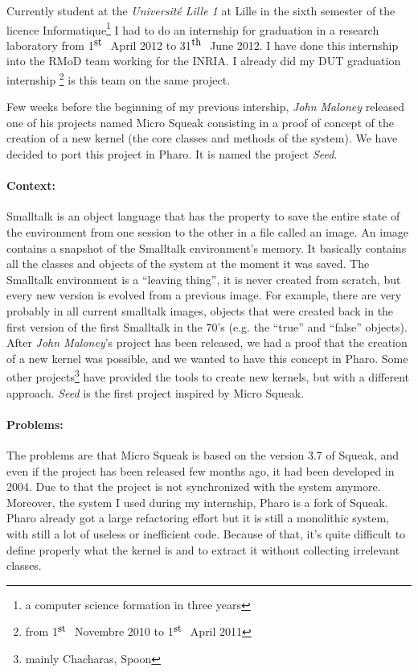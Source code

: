 Currently student at the \emph{Universit\'{e} Lille 1} at Lille in the sixth semester of the licence Informatique\footnote{a computer science formation in three years} I had to do an internship for graduation in a research laboratory from 1$^{\mbox{\small st \normalsize}}$ April 2012 to 31$^{\mbox{\small th \normalsize}}$ June 2012. I have done this internship into the RMoD team working for the \gls{INRIA}. I already did my DUT graduation internship \footnote{from 1$^{\mbox{\small st \normalsize}}$ Novembre 2010 to 1$^{\mbox{\small st \normalsize}}$ April 2011} is this team on the same project.

Few weeks before the beginning of my previous intership, \emph{John Maloney} released one of his projects named \gls{Micro Squeak} consisting in a proof of concept of the creation of a new kernel (the core classes and methods of the system).
We have decided to port this project in \gls{Pharo}. It is named the project \emph{Seed}.

\paragraph{Context:}
Smalltalk is an object language that has the property to save the entire state of the environment from one session to the other in a file called an image. An image contains a snapshot of the Smalltalk environment's memory. It basically contains all the classes and objects of the system at the moment it was saved. The Smalltalk environment is a ``leaving thing'', it is never created from scratch, but every new version is evolved from a previous image. For example, there are very probably in all current smalltalk images, objects that were created back in the first version of the first Smalltalk in the 70's (e.g. the ``true'' and ``false'' objects).
After \emph{John Maloney}'s project has been released, we had a proof that the creation of a new kernel was possible, and we wanted to have this concept in \gls{Pharo}. Some other projects\footnote{mainly Chacharas, Spoon } have provided the tools to create new kernels, but with a different approach. \emph{Seed} is the first project inspired by \gls{Micro Squeak}.

\paragraph{Problems:}
The problems are that \gls{Micro Squeak} is based on the version 3.7 of Squeak, and even if the project has been released few months ago, it had been developed in 2004. Due to that the project is not synchronized with the system anymore. Moreover, the system I used during my internship, \gls{Pharo} is a fork of Squeak. Pharo already got a large refactoring effort but it is still a monolithic system, with still a lot of useless or inefficient code. Because of that, it's quite difficult to define properly what the kernel is and to extract it without collecting irrelevant classes.


